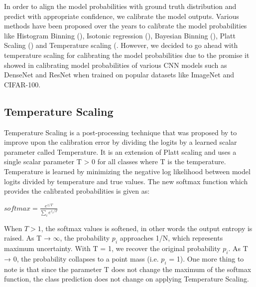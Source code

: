 In order to align the model probabilities with ground truth distribution and predict with appropriate confidence, we calibrate the model outputs. Various methods have been proposed over the years to calibrate the model probabilities like Histogram Binning (\cite{zadrozny2001obtaining}), Isotonic regression (\cite{zadrozny2002transforming}), Bayesian Binning (\cite{naeini2015obtaining}), Platt Scaling (\cite{platt1999probabilistic}) and Temperature scaling (\cite{guo2017calibration}. However, we decided to go ahead with temperature scaling for calibrating the model probabilities due to the promise it showed in calibrating model probabilities of various CNN models such as DenseNet and ResNet when trained on popular datasets like ImageNet and CIFAR-100.

\subsection{Temperature Scaling}

Temperature Scaling is a post-processing technique that was proposed by \cite{guo2017calibration} to improve upon the calibration error by dividing the logits by a learned scalar parameter called Temperature. It is an extension of Platt scaling and uses a single scalar parameter T > 0 for all classes where T is the temperature. Temperature is learned by minimizing the negative log likelihood between model logits divided by temperature and true values. The new softmax function which provides the calibrated probabilities is given as:

\begin{center}
{ $softmax=\frac{e^{z/T}}{\sum_ie^{z_i/T}}$}
\end{center}

When $T>1$, the softmax values is softened, in other words the output entropy is raised. As T → $\infty$, the probability $p_i$ approaches 1/N, which represents maximum uncertainty. With T = 1, we recover the original
probability $p_i$. As T → 0, the probability collapses to a
point mass (i.e. $p_i$ = 1). One more thing to note is that since the parameter T does not change the maximum of the softmax function, the class
prediction does not change on applying Temperature Scaling.


